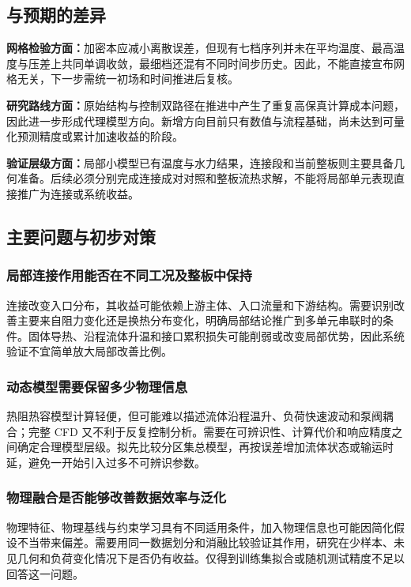 \documentclass[UTF8]{midterm}
\begin{document}
\subsection{与预期的差异}

\textbf{网格检验方面：}加密本应减小离散误差，但现有七档序列并未在平均温度、最高温度与压差上共同单调收敛，最细档还混有不同时间步历史。因此，不能直接宣布网格无关，下一步需统一初场和时间推进后复核。

\textbf{研究路线方面：}原始结构与控制双路径在推进中产生了重复高保真计算成本问题，因此进一步形成代理模型方向。新增方向目前只有数值与流程基础，尚未达到可量化预测精度或累计加速收益的阶段。

\textbf{验证层级方面：}局部小模型已有温度与水力结果，连接段和当前整板则主要具备几何准备。后续必须分别完成连接成对对照和整板流热求解，不能将局部单元表现直接推广为连接或系统收益。


\subsection{主要问题与初步对策}

\subsubsection{局部连接作用能否在不同工况及整板中保持}
连接改变入口分布，其收益可能依赖上游主体、入口流量和下游结构。需要识别改善主要来自阻力变化还是换热分布变化，明确局部结论推广到多单元串联时的条件。固体导热、沿程流体升温和接口累积损失可能削弱或改变局部优势，因此系统验证不宜简单放大局部改善比例。

\subsubsection{动态模型需要保留多少物理信息}
热阻热容模型计算轻便，但可能难以描述流体沿程温升、负荷快速波动和泵阀耦合；完整 CFD 又不利于反复控制分析。需要在可辨识性、计算代价和响应精度之间确定合理模型层级。拟先比较分区集总模型，再按误差增加流体状态或输运时延，避免一开始引入过多不可辨识参数。

\subsubsection{物理融合是否能够改善数据效率与泛化}
物理特征、物理基线与约束学习具有不同适用条件，加入物理信息也可能因简化假设不当带来偏差。需要用同一数据划分和消融比较验证其作用，研究在少样本、未见几何和负荷变化情况下是否仍有收益。仅得到训练集拟合或随机测试精度不足以回答这一问题。
\end{document}
